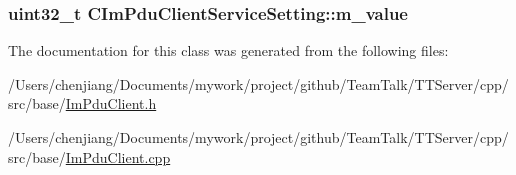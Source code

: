 \subsubsection[{m\+\_\+value}]{\setlength{\rightskip}{0pt plus 5cm}uint32\+\_\+t C\+Im\+Pdu\+Client\+Service\+Setting\+::m\+\_\+value\hspace{0.3cm}{\ttfamily [private]}}\label{class_c_im_pdu_client_service_setting_a3225fa8001dc255f82b262df3dfe835a}


The documentation for this class was generated from the following files\+:\begin{DoxyCompactItemize}
\item 
/\+Users/chenjiang/\+Documents/mywork/project/github/\+Team\+Talk/\+T\+T\+Server/cpp/src/base/\hyperlink{_im_pdu_client_8h}{Im\+Pdu\+Client.\+h}\item 
/\+Users/chenjiang/\+Documents/mywork/project/github/\+Team\+Talk/\+T\+T\+Server/cpp/src/base/\hyperlink{_im_pdu_client_8cpp}{Im\+Pdu\+Client.\+cpp}\end{DoxyCompactItemize}
